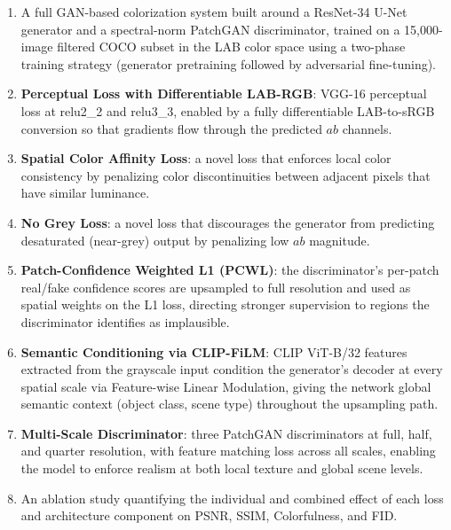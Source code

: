 \documentclass[12pt, a4paper, oneside]{report}
\begin{document}
\begin{enumerate}
    \item A full GAN-based colorization system built around a ResNet-34 U-Net
          generator and a spectral-norm PatchGAN discriminator, trained on a
          15,000-image filtered COCO subset in the LAB color space using a
          two-phase training strategy (generator pretraining followed by
          adversarial fine-tuning).

    \item \textbf{Perceptual Loss with Differentiable LAB-RGB}: VGG-16 perceptual
          loss at relu2\_2 and relu3\_3, enabled by a fully differentiable
          LAB-to-sRGB conversion so that gradients flow through the predicted
          $ab$ channels.

    \item \textbf{Spatial Color Affinity Loss}: a novel loss that enforces local
          color consistency by penalizing color discontinuities between adjacent
          pixels that have similar luminance.

    \item \textbf{No Grey Loss}: a novel loss that discourages the generator from
          predicting desaturated (near-grey) output by penalizing low $ab$ magnitude.

    \item \textbf{Patch-Confidence Weighted L1 (PCWL)}: the discriminator's
          per-patch real/fake confidence scores are upsampled to full resolution
          and used as spatial weights on the L1 loss, directing stronger
          supervision to regions the discriminator identifies as implausible.

    \item \textbf{Semantic Conditioning via CLIP-FiLM}: CLIP ViT-B/32 features
          extracted from the grayscale input condition the generator's decoder
          at every spatial scale via Feature-wise Linear Modulation, giving the
          network global semantic context (object class, scene type) throughout
          the upsampling path.

    \item \textbf{Multi-Scale Discriminator}: three PatchGAN discriminators at
          full, half, and quarter resolution, with feature matching loss across
          all scales, enabling the model to enforce realism at both local texture
          and global scene levels.

    \item An ablation study quantifying the individual and combined effect of each
          loss and architecture component on PSNR, SSIM, Colorfulness, and FID.
\end{enumerate}
\end{document}
